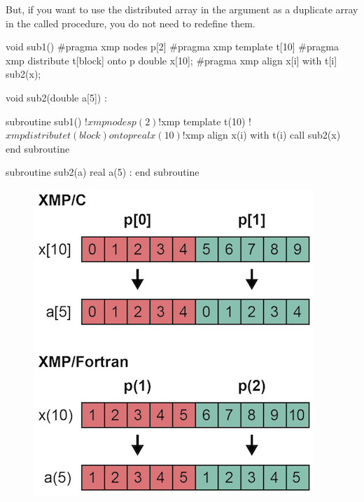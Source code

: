 But, if you want to use the distributed array in the argument as a
duplicate array in the called procedure, you do not need to redefine
them.

\begin{XCexample}
void sub1(){
#pragma xmp nodes p[2]
#pragma xmp template t[10]
#pragma xmp distribute t[block] onto p
  double x[10];
#pragma xmp align x[i] with t[i]
  sub2(x);
}

void sub2(double a[5]){
  :
}
\end{XCexample}

\begin{XFexample}
subroutine sub1()
!$xmp nodes p(2)
!$xmp template t(10)
!$xmp distribute t(block) onto p
  real x(10)
!$xmp align x(i) with t(i)
  call sub2(x)
end subroutine

subroutine sub2(a)
  real a(5)
  :
end subroutine
\end{XFexample}

\begin{figure}
  \centering
  \includegraphics{figs/duplicated_array.png}
\end{figure}